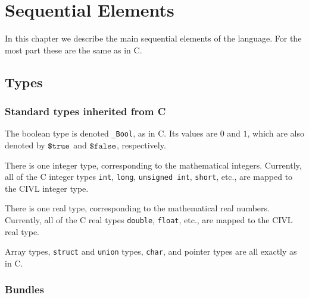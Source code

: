 








\chapter{Sequential Elements}

In this chapter we describe the main sequential elements of the
language.  For the most part these are the same as in C.

\section{Types}

\subsection{Standard types inherited from C}

The boolean type is denoted \verb!_Bool!, as in C. Its values are $0$
and $1$, which are also denoted by $\mbox{\texttt{\${}true}}$ and $\mbox{\texttt{\${}false}}$,
respectively.

There is one integer type, corresponding to the mathematical integers.
Currently, all of the C integer types \texttt{int}, \texttt{long},
\texttt{unsigned\ int}, \texttt{short}, etc., are mapped to the CIVL
integer type.

There is one real type, corresponding to the mathematical real
numbers. Currently, all of the C real types \texttt{double},
\texttt{float}, etc., are mapped to the CIVL real type.

Array types, \texttt{struct} and \texttt{union} types, \texttt{char},
and pointer types are all exactly as in C.


\subsection{Bundles}

